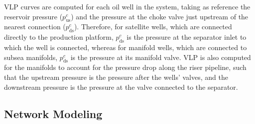 \documentclass[pdflatex,sn-mathphys-num]{sn-jnl}%
\begin{document}
VLP curves are computed for each oil well in the system, taking as reference the reservoir pressure ($p_{\text{us}}^{c}$) and the pressure at the choke valve just upstream of the nearest connection ($p_{\text{ds}}^c$).
Therefore, for satellite wells, which are connected directly to the production platform, $p_{\text{ds}}^{c}$ is the pressure at the separator inlet to which the well is connected, whereas for manifold wells, which are connected to subsea manifolds, $p_{\text{ds}}^{c}$ is the pressure at its manifold valve.
VLP is also computed for the manifolds to account for the pressure drop along the riser pipeline, such that the upstream pressure is the pressure after the wells' valves, and the downstream pressure is the pressure at the valve connected to the separator.

\subsection{Network Modeling}
\end{document}
